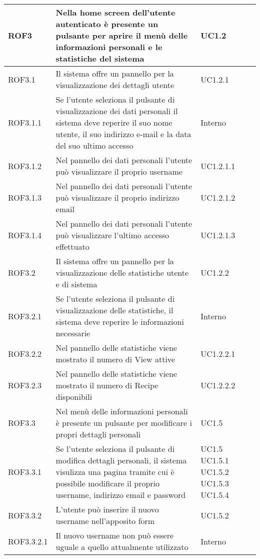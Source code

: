 \begin{center}
\begin{longtable}{| p{2.5cm} | p{8cm} | p{2cm} |}
		ROF3  &  Nella home screen dell'utente autenticato è presente un pulsante per aprire il menù delle informazioni personali e le statistiche del sistema  &  UC1.2 \\
		\hline
		ROF3.1  &  Il sistema offre un pannello per la visualizzazione dei dettagli utente &  UC1.2.1 \\
		\hline
		ROF3.1.1  &  Se l'utente seleziona il pulsante di visualizzazione dei dati personali il sistema deve reperire il suo nome utente, il suo indirizzo e-mail e la data del suo ultimo accesso &  Interno \\
		\hline
		ROF3.1.2  &  Nel pannello dei dati personali l'utente può visualizzare il proprio username  &  UC1.2.1.1 \\
		\hline
		ROF3.1.3  &  Nel pannello dei dati personali l'utente può visualizzare il proprio indirizzo email  &  UC1.2.1.2 \\
		\hline
		ROF3.1.4  &  Nel pannello dei dati personali l'utente può visualizzare l'ultimo accesso effettuato  &  UC1.2.1.3 \\
		\hline
		ROF3.2  &  Il sistema offre un pannello per la visualizzazione delle statistiche utente e di sistema  &  UC1.2.2 \\
		\hline
		ROF3.2.1  &  Se l'utente seleziona il pulsante di visualizzazione delle statistiche, il sistema deve reperire le informazioni necessarie  &  Interno \\
		\hline
		ROF3.2.2 &  Nel pannello delle statistiche viene mostrato il numero di View attive &  UC1.2.2.1 \\
		\hline
		ROF3.2.3  &  Nel pannello delle statistiche viene mostrato il numero di Recipe disponibili &  UC1.2.2.2 \\
		\hline
		ROF3.3  &  Nel menù delle informazioni personali è presente un pulsante per modificare i propri dettagli personali &  UC1.5 \\
		\hline
		ROF3.3.1  &  Se l'utente seleziona il pulsante di modifica dettagli personali, il sistema visulizza una pagina tramite cui è possibile modificare il proprio username, indirizzo email e password &  UC1.5 \newline UC1.5.1 \newline UC1.5.2 \newline UC1.5.3 \newline UC1.5.4 \\
		\hline
		ROF3.3.2  &  L'utente può inserire il nuovo username nell'apposito form  &  UC1.5.2 \\
		\hline
		ROF3.3.2.1  &  Il nuovo username non può essere uguale a quello attualmente utilizzato  &  Interno \\

\end{longtable}
\end{center}
